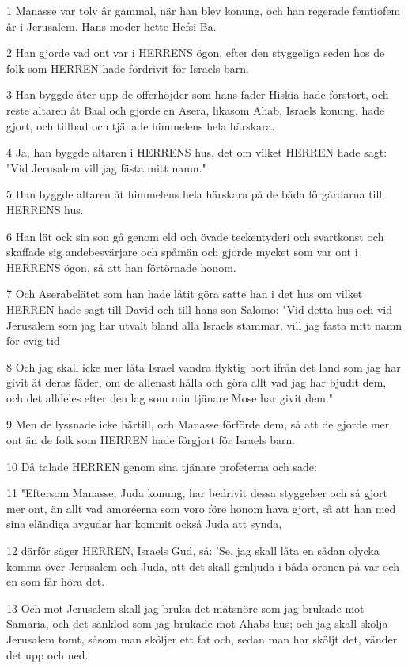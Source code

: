 \par 1 Manasse var tolv år gammal, när han blev konung, och han regerade femtiofem år i Jerusalem. Hans moder hette Hefsi-Ba.
\par 2 Han gjorde vad ont var i HERRENS ögon, efter den styggeliga seden hos de folk som HERREN hade fördrivit för Israels barn.
\par 3 Han byggde åter upp de offerhöjder som hans fader Hiskia hade förstört, och reste altaren åt Baal och gjorde en Asera, likasom Ahab, Israels konung, hade gjort, och tillbad och tjänade himmelens hela härskara.
\par 4 Ja, han byggde altaren i HERRENS hus, det om vilket HERREN hade sagt: "Vid Jerusalem vill jag fästa mitt namn."
\par 5 Han byggde altaren åt himmelens hela härskara på de båda förgårdarna till HERRENS hus.
\par 6 Han lät ock sin son gå genom eld och övade teckentyderi och svartkonst och skaffade sig andebesvärjare och spåmän och gjorde mycket som var ont i HERRENS ögon, så att han förtörnade honom.
\par 7 Och Aserabelätet som han hade låtit göra satte han i det hus om vilket HERREN hade sagt till David och till hans son Salomo: "Vid detta hus och vid Jerusalem som jag har utvalt bland alla Israels stammar, vill jag fästa mitt namn för evig tid
\par 8 Och jag skall icke mer låta Israel vandra flyktig bort ifrån det land som jag har givit åt deras fäder, om de allenast hålla och göra allt vad jag har bjudit dem, och det alldeles efter den lag som min tjänare Mose har givit dem."
\par 9 Men de lyssnade icke härtill, och Manasse förförde dem, så att de gjorde mer ont än de folk som HERREN hade förgjort för Israels barn.
\par 10 Då talade HERREN genom sina tjänare profeterna och sade:
\par 11 "Eftersom Manasse, Juda konung, har bedrivit dessa styggelser och så gjort mer ont, än allt vad amoréerna som voro före honom hava gjort, så att han med sina eländiga avgudar har kommit också Juda att synda,
\par 12 därför säger HERREN, Israels Gud, så: 'Se, jag skall låta en sådan olycka komma över Jerusalem och Juda, att det skall genljuda i båda öronen på var och en som får höra det.
\par 13 Och mot Jerusalem skall jag bruka det mätsnöre som jag brukade mot Samaria, och det sänklod som jag brukade mot Ahabs hus; och jag skall skölja Jerusalem tomt, såsom man sköljer ett fat och, sedan man har sköljt det, vänder det upp och ned.
